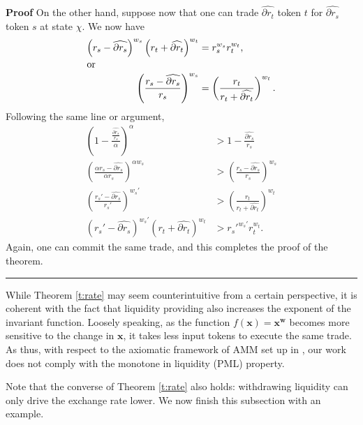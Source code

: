\documentclass[12pt,a4paper]{article}
\newcommand{\qed}{\rule{.07in}{.1in}}
\newenvironment{proof}{\vspace{1ex}\noindent\textbf{Proof}\hspace{0.5em}}{\hfill\qed\vspace{1ex}}
\begin{document}
\begin{proof}
On the other hand, suppose now that one can trade $\widehat{\partial r_t}$ token $t$ for $\widehat{\partial r_s}$ token $s$ at state $\chi$. We now have
\begin{align*}
\left(r_s-\widehat{\partial r_s}\right)^{w_s}\left(r_t+\widehat{\partial r_t}\right)^{w_t} & =r_s^{w_s}r_t^{w_t}, \\
\intertext{or}
\left(\frac{r_s-\widehat{\partial r_s}}{r_s}\right)^{w_s} & =\left(\frac{r_t}{r_t+\widehat{\partial r_t}}\right)^{w_t}.
\end{align*}
Following the same line or argument,
\begin{align*}
\left(1-\frac{\frac{\widehat{\partial r_s}}{r_s}}{\alpha}\right)^\alpha & >1-\frac{\widehat{\partial r_s}}{r_s} \\
\left(\frac{\alpha r_s-\widehat{\partial r_s}}{\alpha r_s}\right)^{\alpha w_s} & >\left(\frac{r_s-\widehat{\partial r_s}}{r_s}\right)^{w_s} \\
\left(\frac{r_s'-\widehat{\partial r_s}}{r_s'}\right)^{w_s'} & >\left(\frac{r_t}{r_t+\widehat{\partial r_t}}\right)^{w_t} \\
\left(r_s'-\widehat{\partial r_s}\right)^{w_s'}\left(r_t+\widehat{\partial r_t}\right)^{w_t} & >r_s'^{w_s'}r_t^{w_t}.
\end{align*}
Again, one can commit the same trade, and this completes the proof of the theorem.
\end{proof}

While Theorem \ref{t:rate} may seem counterintuitive from a certain perspective, it is coherent with the fact that liquidity providing also increases the exponent of the invariant function. Loosely speaking, as the function $f(\mathbf{x})=\mathbf{x}^\mathbf{w}$ becomes more sensitive to the change in $\mathbf{x}$, it takes less input tokens to execute the same trade. As thus, with respect to the axiomatic framework of AMM set up in \cite{BF}, our work does not comply with the monotone in liquidity (PML) property.

Note that the converse of Theorem \ref{t:rate} also holds: withdrawing liquidity can only drive the exchange rate lower. We now finish this subsection with an example.
\end{document}
